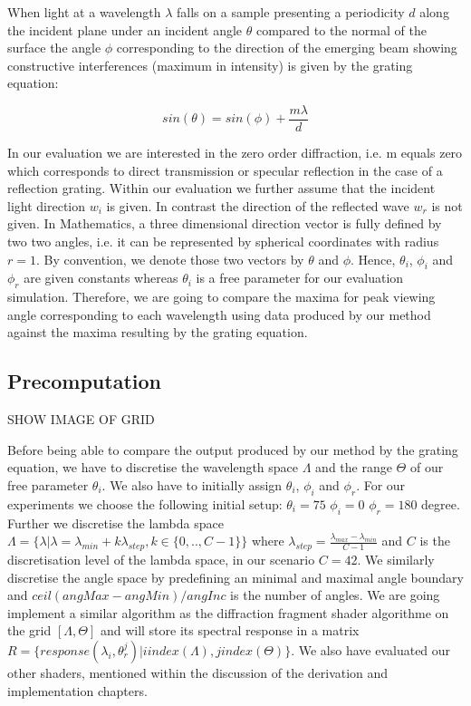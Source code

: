 When light at a wavelength $\lambda$ falls on a sample presenting a periodicity $d$ along the incident plane under an incident angle $\theta$ compared to the normal of the surface the angle $\phi$ corresponding to the direction of the emerging beam showing constructive interferences (maximum in intensity) is given by the grating equation:

\begin{equation}
  sin(\theta) = sin(\phi) + \frac{m \lambda}{d}
  \label{eq:gratingEq}
\end{equation}

In our evaluation we are interested in the zero order diffraction, i.e. m equals zero which corresponds to direct transmission or specular reflection in the case of a reflection grating. 
Within our evaluation we further assume that the incident light direction $w_i$ is given. In contrast the direction of the reflected wave $w_r$ is not given.
In Mathematics, a three dimensional direction vector is fully defined by two two angles, i.e. it can be represented by spherical coordinates with radius $r = 1$. By convention, we denote those two vectors by $\theta$ and $\phi$. Hence, $\theta_i$, $\phi_i$ and $\phi_r$ are given constants whereas $\theta_i$ is a free parameter for our evaluation simulation. Therefore, we are going to compare the maxima for peak viewing angle corresponding to each wavelength using data produced by our method against the maxima resulting by the grating equation.

\subsection{Precomputation}
SHOW IMAGE OF GRID

Before being able to compare the output produced by our method by the grating equation, we have to discretise the wavelength space $\Lambda$ and the range $\Theta$ of our free parameter $\theta_i$. We also have to initially assign  $\theta_i$, $\phi_i$ and $\phi_r$. For our experiments we choose the following initial setup: $\theta_i = 75$ $\phi_i = 0$ $\phi_r = 180$ degree.
Further we discretise the lambda space $\Lambda = \{\lambda | \lambda = \lambda_{min} + k\lambda_{step}, k \in \{0,..,C-1\}\}$ where $\lambda_{step} = \frac{\lambda_{max}-\lambda_{min}}{C-1}$ and $C$ is the discretisation level of the lambda space, in our scenario $C = 42$. We similarly discretise the angle space by predefining an minimal and maximal angle boundary and $ceil(angMax - angMin) / angInc$ is the number of angles. 
We are going implement a similar algorithm as the diffraction fragment shader algorithme on the grid $[\Lambda, \Theta]$ and will store its spectral response in a matrix $R = \{response(\lambda_i, \theta_{r}^{j}) | i index(\Lambda), j index(\Theta)\}$. We also have evaluated our other shaders, mentioned within the discussion of the derivation and implementation chapters.

